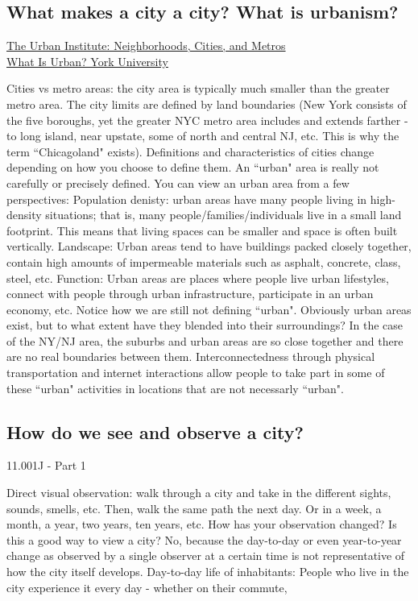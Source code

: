 \documentclass{article}
\begin{document}
        \subsection{What makes a city a city? What is urbanism?}
        \small{\href{https://www.urban.org/urban-wire/what-defines-city}{The Urban Institute: Neighborhoods, Cities, and Metros}}\\
        \small{\href{https://www.yorku.ca/anderson/Intro%20Urban%20Studies/Unit1/what_is_urban.htm}{What Is Urban? York University}}
        \normalsize
        \begin{outline}
            \1 Cities vs metro areas: the city area is typically much smaller than the greater metro area. The city limits are defined by land boundaries (New York consists of the five boroughs, yet the greater NYC metro area includes and extends farther - to long island, near upstate, some of north and central NJ, etc. This is why the term ``Chicagoland" exists). 
            \1 Definitions and characteristics of cities change depending on how you choose to define them. 
            \1 An ``urban" area is really not carefully or precisely defined. You can view an urban area from a few perspectives:
                \2 Population denisty: urban areas have many people living in high-density situations; that is, many people/families/individuals live in a small land footprint. This means that living spaces can be smaller and space is often built vertically. 
                \2 Landscape: Urban areas tend to have buildings packed closely together, contain high amounts of impermeable materials such as asphalt, concrete, class, steel, etc. 
                \2 Function: Urban areas are places where people live urban lifestyles, connect with people through urban infrastructure, participate in an urban economy, etc. Notice how we are still not defining ``urban". 
            \1 Obviously urban areas exist, but to what extent have they blended into their surroundings? In the case of the NY/NJ area, the suburbs and urban areas are so close together and there are no real boundaries between them. Interconnectedness through physical transportation and internet interactions allow people to take part in some of these ``urban" activities in locations that are not necessarly ``urban". 
        \end{outline}
        \subsection{How do we see and observe a city?}
        \small 11.001J - Part 1
        \normalsize 
        \begin{outline}
            \1 Direct visual observation: walk through a city and take in the different sights, sounds, smells, etc. Then, walk the same path the next day. Or in a week, a month, a year, two years, ten years, etc. How has your observation changed?
                \2 Is this a good way to view a city? No, because the day-to-day or even year-to-year change as observed by a single observer at a certain time is not representative of how the city itself develops. 
            \1 Day-to-day life of inhabitants: People who live in the city experience it every day - whether on their commute, 
        \end{outline}
\end{document}

